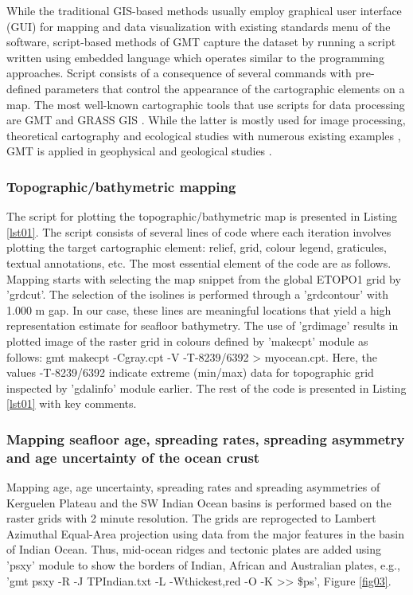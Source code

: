 \documentclass[geomatics,article,submit,pdftex,moreauthors]{Definitions/mdpi}
\begin{document}
While the traditional GIS-based methods usually employ graphical user interface (GUI) for mapping and data visualization with existing standards menu of the software, script-based methods of GMT capture the dataset by running a script written using embedded language which operates similar to the programming approaches. Script consists of a consequence of several commands with pre-defined parameters that control the appearance of the cartographic elements on a map. The most well-known cartographic tools that use scripts for data processing are GMT \cite{Lemenkova202217} and GRASS GIS \cite{NETELER2012124}. While the latter is mostly used for image processing, theoretical cartography and ecological studies with numerous existing examples  \cite{ROCCHINI2017166,FRIGERI20111265,Lemenkova202313,SOROKINE2007685}, GMT is applied in geophysical and geological studies \cite{Lee,Lemenkova202206,DeSanto}.

\subsubsection{Topographic/bathymetric mapping}

The script for plotting the topographic/bathymetric map is presented in Listing \ref{lst01}. The script consists of several lines of code where each iteration involves plotting the target cartographic element: relief, grid, colour legend, graticules, textual annotations, etc. The most essential element of the code are as follows. Mapping starts with selecting the map snippet from the global ETOPO1 grid by 'grdcut'. The selection of the isolines is performed through a 'grdcontour' with 1.000 m gap. In our case, these lines are meaningful locations that yield a high representation estimate for seafloor bathymetry. The use of 'grdimage' results in plotted image of the raster grid in colours defined by 'makecpt' module as follows: gmt makecpt -Cgray.cpt -V -T-8239/6392 > myocean.cpt. Here, the values -T-8239/6392 indicate extreme (min/max) data for topographic grid inspected by 'gdalinfo' module earlier. The rest of the code is presented in Listing \ref{lst01} with key comments.

\subsubsection{Mapping seafloor age, spreading rates, spreading asymmetry and age uncertainty of the ocean crust}

Mapping age, age uncertainty, spreading rates and spreading asymmetries of Kerguelen Plateau and the SW Indian Ocean basins is performed based on the raster grids with 2 minute resolution. The grids are reprogected to Lambert Azimuthal Equal-Area projection using data from the major features in the basin of Indian Ocean. Thus, mid-ocean ridges and tectonic plates are added using 'psxy' module to show the borders of Indian, African and Australian plates, e.g., 'gmt psxy -R -J TPIndian.txt -L -Wthickest,red -O -K >> \$ps', Figure \ref{fig03}. 
\end{document}
